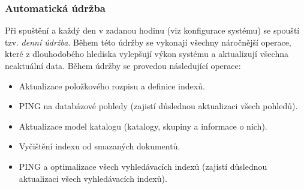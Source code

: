 \subsubsection{Automatická údržba}

Při spuštění a každý den v zadanou hodinu (viz konfigurace systému) se spouští tzv. {\em denní údržba}. Během této údržby se vykonají všechny náročnější operace, které z dlouhodobého hlediska vylepšují výkon systému a aktualizují všechna neaktuální data. Během údržby se provedou následující operace: 

\begin{itemize}
\item{Aktualizace položkového rozpisu a definice indexů.}
\item{PING na databázové pohledy (zajistí důslednou aktualizaci všech pohledů).}
\item{Aktualizace model katalogu (katalogy, skupiny a informace o nich).}
\item{Vyčištění indexu od smazaných dokumentů.}
\item{PING a optimalizace všech vyhledávacích indexů (zajistí důslednou aktualizaci všech vyhledávacích indexů).}
\end{itemize}
